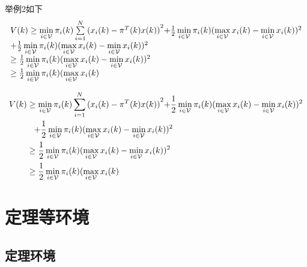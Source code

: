 举例2如下
\[\begin{array}{l}
V(k) \ge \mathop {\min }\limits_{i \in {\cal V}} {\pi _i}(k)\sum\limits_{i = 1}^N {{{({x_i}(k) - {\pi ^T}(k)x(k))}^2}} {\rm{ + }}\frac{1}{2}\mathop {\min }\limits_{i \in {\cal V}} {\pi _i}(k){(\mathop {\max }\limits_{i \in {\cal V}} {x_i}(k) - \mathop {\min }\limits_{i \in {\cal V}} {x_i}(k))^2}\\
{\rm{ + }}\frac{1}{2}\mathop {\min }\limits_{i \in {\cal V}} {\pi _i}(k){(\mathop {\max }\limits_{i \in {\cal V}} {x_i}(k) - \mathop {\min }\limits_{i \in {\cal V}} {x_i}(k))^2}\\
 \ge \frac{1}{2}\mathop {\min }\limits_{i \in {\cal V}} {\pi _i}(k){(\mathop {\max }\limits_{i \in {\cal V}} {x_i}(k) - \mathop {\min }\limits_{i \in {\cal V}} {x_i}(k))^2}\\
 \ge \frac{1}{2}\mathop {\min }\limits_{i \in {\cal V}} {\pi _i}(k)(\mathop {\max }\limits_{i \in {\cal V}} {x_i}(k)
\end{array}\]




\begin{equation}\label{system4}
  \begin{split}
V(k) &\ge \mathop {\min }\limits_{i \in {\cal V}} {\pi _i}(k)\sum\limits_{i = 1}^N {{{({x_i}(k) - {\pi ^T}(k)x(k))}^2}} {\rm{ + }}\frac{1}{2}\mathop {\min }\limits_{i \in {\cal V}} {\pi _i}(k){(\mathop {\max }\limits_{i \in {\cal V}} {x_i}(k) - \mathop {\min }\limits_{i \in {\cal V}} {x_i}(k))^2}\\
&\hspace{0.3cm}{\rm{ + }}\frac{1}{2}\mathop {\min }\limits_{i \in {\cal V}} {\pi _i}(k){(\mathop {\max }\limits_{i \in {\cal V}} {x_i}(k) - \mathop {\min }\limits_{i \in {\cal V}} {x_i}(k))^2}\\
& \ge \frac{1}{2}\mathop {\min }\limits_{i \in {\cal V}} {\pi _i}(k){(\mathop {\max }\limits_{i \in {\cal V}} {x_i}(k) - \mathop {\min }\limits_{i \in {\cal V}} {x_i}(k))^2}\\
 &\ge \frac{1}{2}\mathop {\min }\limits_{i \in {\cal V}} {\pi _i}(k)(\mathop {\max }\limits_{i \in {\cal V}} {x_i}(k)
  \end{split}
\end{equation}


\section{定理等环境}
\subsection{定理环境}

